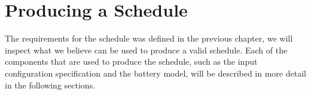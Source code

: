 \chapter{Producing a Schedule} \label{cha:produce}
The requirements for the schedule was defined in the previous chapter, we will inspect what we believe can be used to produce a valid schedule. Each of the components that are used to produce the schedule, such as the input configuration specification and the battery model, will be described in more detail in the following sections.








